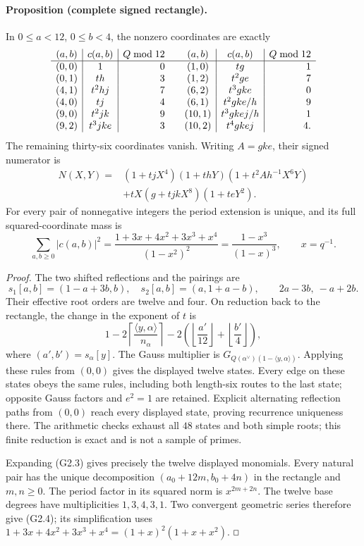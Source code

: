 \documentclass[11pt]{article}
\renewcommand{\square}{\mathord{\vcenter{\hrule\hbox{\vrule height .45em\kern .45em\vrule}\hrule}}}
\begin{document}
\paragraph{Proposition (complete signed rectangle).}
In $0\le a<12$, $0\le b<4$, the nonzero coordinates are exactly
\[
\begin{array}{c|c|r@{\qquad}c|c|r}
(a,b)&c(a,b)&Q\bmod12&(a,b)&c(a,b)&Q\bmod12\\ \hline
(0,0)&1&0&(1,0)&tg&1\\
(0,1)&th&3&(1,2)&t^2ge&7\\
(4,1)&t^2hj&7&(6,2)&t^3gke&0\\
(4,0)&tj&4&(6,1)&t^2gke/h&9\\
(9,0)&t^2jk&9&(10,1)&t^3gkej/h&1\\
(9,2)&t^3jke&3&(10,2)&t^4gkej&4 .
\end{array}
\]
The remaining thirty-six coordinates vanish.
Writing $A=gke$, their signed numerator is
\[
\begin{split}
 N(X,Y)={}&(1+tjX^4)(1+thY)(1+t^2A h^{-1}X^6Y)\\
 &+tX(g+tjkX^8)(1+teY^2).
\end{split}
 \tag{G2.3}
\]
For every pair of nonnegative integers the period extension is unique,
and its full squared-coordinate mass is
\[
 \sum_{a,b\ge0}|c(a,b)|^2
 =\frac{1+3x+4x^2+3x^3+x^4}{(1-x^2)^2}
 =\frac{1-x^3}{(1-x)^3},\qquad x=q^{-1}.
 \tag{G2.4}
\]

\textit{Proof.}
The two shifted reflections and the pairings are
\[
 s_1[a,b]=(1-a+3b,b),\quad s_2[a,b]=(a,1+a-b),
 \qquad 2a-3b,\ -a+2b.
\]
Their effective root orders are twelve and four.
On reduction back to the rectangle, the change in the exponent of $t$ is
\[
 1-2\left\lceil\frac{\langle y,\alpha\rangle}{n_\alpha}\right\rceil
 -2\left(\left\lfloor\frac{a'}{12}\right\rfloor+
          \left\lfloor\frac{b'}4\right\rfloor\right),
\]
where $(a',b')=s_\alpha[y]$. The Gauss multiplier is
$G_{Q(\alpha^\vee)(1-\langle y,\alpha\rangle)}$.
Applying these rules from $(0,0)$ gives the displayed twelve states.
Every edge on these states obeys the same rules, including both
length-six routes to the last state; opposite Gauss factors and $e^2=1$
are retained. Explicit alternating reflection paths from $(0,0)$
reach every displayed state, proving recurrence uniqueness there.
The arithmetic checks exhaust all $48$ states and both simple roots;
this finite reduction is exact and is not a sample of primes.

Expanding (G2.3) gives precisely the twelve displayed monomials.
Every natural pair has the unique decomposition
$(a_0+12m,b_0+4n)$ in the rectangle and $m,n\ge0$.
The period factor in its squared norm is $x^{2m+2n}$.
The twelve base degrees have multiplicities $1,3,4,3,1$.
Two convergent geometric series therefore give (G2.4);
its simplification uses
$1+3x+4x^2+3x^3+x^4=(1+x)^2(1+x+x^2)$.
\hfill$\square$
\end{document}
